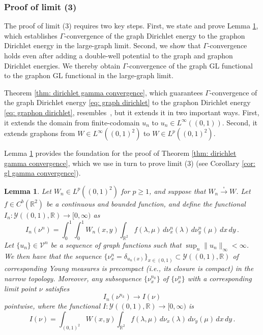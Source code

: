 \documentclass[11pt]{amsart}
\newtheorem{lemma}{Lemma}[section]
\def\R{\mathbb{R}}
\def\calY{\mathcal{Y}}
\def\sqra{\stackrel{\square}{\longrightarrow}}
\numberwithin{equation}{section}
\begin{document}
{{%

\subsubsection{{Proof} of limit (3)}

{The proof of limit (3) requires two {key} steps. First, we state and prove Lemma \ref{lemma: limit 3 pointwise}, which establishes $\Gamma$-convergence of the graph Dirichlet energy to the graphon Dirichlet energy in the large-graph limit. Second, we show {that} $\Gamma$-convergence holds even after adding a double-well potential to the graph and graphon Dirichlet energies. {We thereby obtain} $\Gamma$-convergence of the graph GL functional to the graphon GL functional in the large-graph limit.}

Theorem \ref{thm: dirichlet gamma convergence}, which guarantees $\Gamma$-convergence of the graph Dirichlet energy \eqref{eq: graph dirichlet} to the graphon Dirichlet energy \eqref{eq: graphon dirichlet}, resembles~\cite[Theorem 12]{braides2020cut}, but it extends it in two important ways. First, it extends the domain from finite-codomain $u_n$ to $u_n \in L^\infty((0,1))$. Second, it extends graphons from $W \in L^\infty((0,1)^2)$ to $W \in L^p((0,1)^2)$. 

Lemma \ref{lemma: limit 3 pointwise}
provides the foundation for the proof of Theorem \ref{thm: dirichlet gamma convergence}, which we use in turn to prove limit (3) (see Corollary \ref{cor: gl gamma convergence}). 

\begin{lemma}\label{lemma: limit 3 pointwise} 
Let $W_n \in L^p((0,1)^2)$ for $p \geq 1$, and suppose that $W_n \sqra W$. Let $f \in C^b(\R^2)$ be a continuous and bounded function, and define the functional $I_n : \calY((0,1),\mathbb{R}) \to [0,\infty)$ as
\begin{equation*}
    I_n(\nu^n) = \int_0^1\int_0^1 W_n(x,y) \int_{\R^2} f(\lambda,\mu) \,d\nu^n_x (\lambda) \,d\nu^n_y(\mu) \,dx \, dy \,.
\end{equation*}
Let {$\{u_n\} \in \mathcal{V}^n$} be a sequence of graph functions such that $\sup_n \|u_n\|_\infty < \infty$. We then have that the {sequence $\{ \nu_x^n = \delta_{u_n(x)}\}_{x\in (0,1)} \subset \mathcal{Y}((0,1),\mathbb{R})$ of corresponding Young measures is} precompact (i.e., its closure is compact) in the narrow topology. Moreover, any subsequence $\{ \nu_x^{n_k} \}$ of $\{\nu^n_x\}$ with a corresponding limit point $\nu$ satisfies
\begin{equation}
	I_n(\nu^{n_k}) \rightarrow I(\nu)
\end{equation}	
pointwise, where the functional $I : \mathcal{Y}((0,1),\mathbb{R}) \to [0,\infty)$ is 
\begin{equation*}
    I(\nu) = \int_{(0,1)^2} W(x,y) \int_{\R^2} f(\lambda,\mu) \,d\nu_x(\lambda) \,d\nu_y(\mu)  \,dx \, dy \,.
\end{equation*}
\end{lemma}

}}
\end{document}
